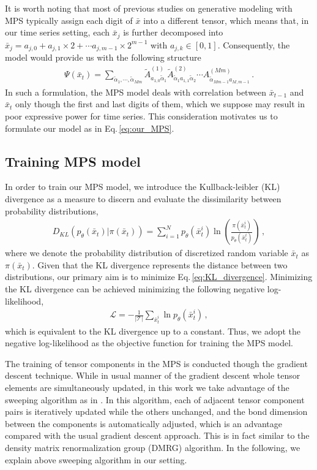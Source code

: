 {It is worth noting that most of previous studies on generative modeling with MPS typically assign each digit of $\bar x$ into a different tensor, which means that, in our time series setting, each $\bar{x}_j$ is further decomposed into $\bar{x}_j = a_{j,0} + a_{j,1} \times 2 + \cdots a_{j,m-1} \times 2^{m-1} $ with $a_{j,k} \in [0,1]$.
Consequently, the model would provide us with the following structure 
\begin{align}
    \Psi(\bar x_t) = \sum_{\tilde\alpha_1,\cdots,\tilde\alpha_{Mm}} \tilde{A}^{(1)}_{a_{1,0}\tilde\alpha_1 } \tilde{A}^{(2)}_{\tilde\alpha_1 a_{1,1} \tilde\alpha_2} \cdots A^{(Mm)}_{\tilde\alpha_{Mm-1}a_{M,m-1}} \, .
\end{align} 
In such a formulation, the MPS model deals with correlation between $\bar x_{t-1}$ and $\bar x_t$ only though the first and last digits of them, which we suppose may result in poor expressive power for time series.
This consideration motivates us to formulate our model as in Eq.\,\eqref{eq:our_MPS}.

\subsection{Training MPS model}
In order to train our MPS model, we introduce the Kullback-leibler (KL) divergence as a measure to discern and evaluate the dissimilarity between probability distributions,
\begin{align}
    D_{KL} \left( p_\theta (\bar x_t) | \pi (\bar x_t) \right) = \sum_{i=1}^N p_\theta (\bar x_t^i) \ln \left(\frac{\pi (\bar x_t^i)}{p_\theta (\bar x_t^i)} \right) \, , \label{eq:KL_divergence}
\end{align}
where we denote the probability distribution of discretized random variable $\bar x_t$ as $\pi (\bar x_t)$. 
Given that the KL divergence represents the distance between two distributions, our primary aim is to minimize Eq.\,\eqref{eq:KL_divergence}.
Minimizing the KL divergence can be achieved minimizing the following negative log-likelihood,
\begin{align}
    \mathcal{L} = - \frac{1}{|\mathcal{T}|} \sum_{\bar{x}_t^i} \ln p_\theta (\bar x_t^i) \, , 
\end{align}
which is equivalent to the KL divergence up to a constant.
Thus, we adopt the negative log-likelihood as the objective function for training the MPS model.

The training of tensor components in the MPS is conducted though the gradient descent technique.
While in usual manner of the gradient descent whole tensor elements are simultaneously updated, in this work we take advantage of the sweeping algorithm as in \cite{han2018unsupervised}.
In this algorithm, each of adjacent tensor component pairs is iteratively updated while the others unchanged, and the bond dimension between the components is automatically adjusted, which is an advantage compared with the usual gradient descent approach.
This is in fact similar to the density matrix renormalization group (DMRG) algorithm.
In the following, we explain above sweeping algorithm in our setting.

}
